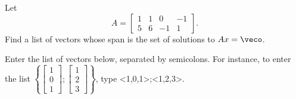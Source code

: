 

Let  \[A = \left[ \begin{array}{cccc} 1 & 1 & 0 & -1\\ 
5 & 6 & -1 & 1 \end{array} \right].\]  Find a list
of vectors whose span is the set of solutions to $Ax = \veco$.  

Enter the list of vectors below, separated by semicolons.  For instance, 
to enter the list $\left\{\left[\begin{array}{c} 1 \\ 0 \\ 1
\end{array} \right]; \left[\begin{array}{c} 1 \\ 2 \\ 3
\end{array} \right] \right\}$, type <1,0,1>;<1,2,3>.  







